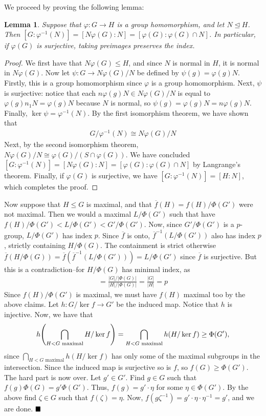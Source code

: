 \documentclass[12pt]{article}
\newtheorem{lemma}{Lemma}
\theoremstyle{definitionstyle}
\def \cph{\varphi}
\newcommand{\nsg}{\trianglelefteq}
\begin{document}
\begin{enumerate}[leftmargin=\labelsep]
		We proceed by proving the following lemma:
		\begin{lemma}
			Suppose that $\cph: G \to H$ is a group homomorphism, and let $N \nsg H$. Then $[G : \cph^{-1}(N)] = [N\cph(G) : N] = [\cph(G) : \cph(G) \cap N]$. In particular, if $\cph(G)$ is surjective, taking preimages preserves the index.
		\end{lemma}
		\begin{proof}
			We first have that $N\cph(G) \leq H$, and since $N$ is normal in $H$, it is normal in $N\cph(G)$. Now let $\psi: G \to N\cph(G)/N$ be defined by $\psi(g) = \cph(g)N$. Firstly, this is a group homomorphism since $\cph$ is a group homomorphism. Next, $\psi$ is surjective: notice that each $n\cph(g)N \in N\cph(G)/N$ is equal to $\cph(g)n_1N = \cph(g)N$ because $N$ is normal, so $\psi(g) = \cph(g)N = n\cph(g)N$. Finally, $\ker \psi = \cph^{-1}(N)$. By the first isomorphism theorem, we have shown that
			\begin{align*}
				G/\cph^{-1}(N) \cong N\cph(G)/N
			\end{align*}
			Next, by the second isomorphism theorem, $N\cph(G)/N \cong \cph(G)/(S \cap \cph(G))$. We have concluded $[G : \cph^{-1}(N)] = [N\cph(G) : N] = [\cph(G) : \cph(G) \cap N]$ by Langrange's theorem. Finally, if $\cph(G)$ is surjective, we have $[G : \cph^{-1}(N)] = [H : N]$, which completes the proof.
		\end{proof}
		Now suppose that $H \leq G$ is maximal, and that $\overline f(H) = f(H)/\Phi(G')$ were not maximal. Then we would a maximal $L/\Phi(G')$ such that have $f(H)/\Phi(G') < L / \Phi(G') < G'/\Phi(G')$. Now, since $G'/\Phi(G')$ is a $p$-group, $L / \Phi(G')$ has index $p$. Since $\overline f$ is onto, $\overline f^{-1}(L / \Phi(G'))$ also has index $p$, strictly containing $H/\Phi(G)$. The containment is strict otherwise $\overline f(H/\Phi(G)) = \overline f(\overline f^{-1}(L / \Phi(G'))) = L / \Phi(G')$ since $\overline f$ is surjective. But this is a contradiction--for $H/\Phi(G)$ has minimal index, as 
		\begin{align*}
			[G/\Phi(G) : H/\Phi(G)] = \frac{|G|/|\Phi(G)|}{|H|/|\Phi(G)|} = \frac{|G|}{|H|} = p
		\end{align*}
		Since $f(H)/\Phi(G')$ is maximal, we must have $f(H)$ maximal too by the above claims. Let $h: G/\ker f \to G'$ be the induced map. Notice that $h$ is injective. Now, we have that 
		\begin{align*}
			h\qty(\bigcap_{H < G \text{ maximal}} H/\ker f) = \bigcap_{H < G \text{ maximal}} h(H / \ker f) \geq \Phi(G'),
		\end{align*} since $\bigcap_{H < G \text{ maximal}} h(H / \ker f)$ has only some of the maximal subgroups in the intersection. Since the induced map is surjective so is $f$, so $f(G) \geq \Phi(G')$. The hard part is now over. Let $g' \in G'$. Find $g \in G$ such that $f(g)\Phi(G) = g'\Phi(G')$. Thus, $f(g) = g' \cdot \eta$ for some $\eta \in \Phi(G')$. By the above find $\zeta \in G$ such that $f(\zeta) = \eta$. Now, $f(g\zeta^{-1}) = g' \cdot \eta \cdot \eta^{-1} = g'$, and we are done. $\hfill \blacksquare$
		

\end{enumerate}
\end{document}
